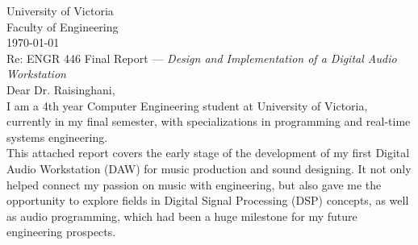 
\begin{flushleft}
University of Victoria \\
Faculty of Engineering \\
\today \\[1.5em]

Re: ENGR 446 Final Report --- \textit{%
Design and Implementation of a Digital Audio Workstation
} \\[1.5em]

Dear Dr. Raisinghani, \\[1em]

 
\hspace{1.5em}
I am a 4th year Computer Engineering student at University of Victoria, currently
in my final semester, with specializations in programming and real-time systems engineering.
\\[1em]


\hspace{1.5em}
This attached report covers the early stage of the development of my
first Digital Audio Workstation (DAW) for music production and sound designing.
It not only helped connect my passion on music with engineering, but also gave
me the opportunity to explore fields in Digital Signal Processing (DSP) concepts, as well as
audio programming, which had been a huge milestone for my future engineering prospects.
\\[1em]


\end{flushleft}
